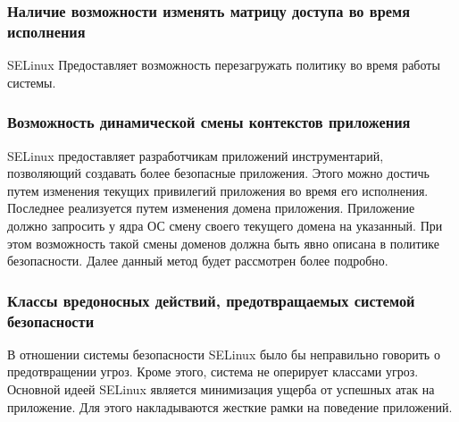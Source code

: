 \subsubsection{Наличие возможности изменять матрицу доступа 
	во время исполнения} 

SELinux Предоставляет возможность перезагружать 
	политику во время работы системы. 

\subsubsection{Возможность динамической смены контекстов 
приложения} 
 
SELinux предоставляет разработчикам приложений 
инструментарий, позволяющий создавать более 
безопасные приложения. Этого можно достичь 
путем изменения текущих привилегий приложения 
во время его исполнения. 
Последнее реализуется путем изменения домена приложения. 
Приложение должно запросить у ядра ОС смену своего 
текущего домена на указанный. При этом возможность
такой смены доменов должна быть явно описана в 
политике безопасности. Далее данный метод будет
рассмотрен более подробно.  

\subsubsection{Классы вредоносных действий, предотвращаемых 
	системой безопасности} 

В отношении системы безопасности SELinux было бы неправильно 
говорить о предотвращении угроз. Кроме этого, система не 
оперирует классами угроз. Основной идеей SELinux является 
минимизация ущерба от успешных атак на приложение. Для 
этого накладываются жесткие рамки на поведение приложений. 


